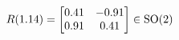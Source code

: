 \documentclass[preview]{standalone}
\begin{document}
\begin{align*}
\special{dvisvgm:raw <g id='unique000'>}R(1.14) = \begin{bmatrix} 0.41 & -0.91 \\ 0.91 & 0.41 \end{bmatrix} \in \text{SO}(2)\special{dvisvgm:raw </g>}
\end{align*}
\end{document}
